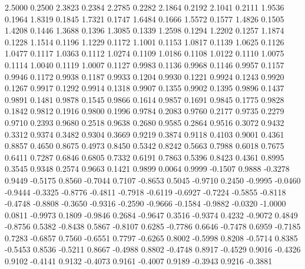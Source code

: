     2.5000    0.2500
    2.3823    0.2384
    2.2785    0.2282
    2.1864    0.2192
    2.1041    0.2111
    1.9536    0.1964
    1.8319    0.1845
    1.7321    0.1747
    1.6484    0.1666
    1.5572    0.1577
    1.4826    0.1505
    1.4208    0.1446
    1.3688    0.1396
    1.3085    0.1339
    1.2598    0.1294
    1.2202    0.1257
    1.1874    0.1228
    1.1514    0.1196
    1.1229    0.1172
    1.1001    0.1153
    1.0817    0.1139
    1.0625    0.1126
    1.0477    0.1117
    1.0363    0.1112
    1.0274    0.1109
    1.0186    0.1108
    1.0122    0.1110
    1.0075    0.1114
    1.0040    0.1119
    1.0007    0.1127
    0.9983    0.1136
    0.9968    0.1146
    0.9957    0.1157
    0.9946    0.1172
    0.9938    0.1187
    0.9933    0.1204
    0.9930    0.1221
    0.9924    0.1243
    0.9920    0.1267
    0.9917    0.1292
    0.9914    0.1318
    0.9907    0.1355
    0.9902    0.1395
    0.9896    0.1437
    0.9891    0.1481
    0.9878    0.1545
    0.9866    0.1614
    0.9857    0.1691
    0.9845    0.1775
    0.9828    0.1842
    0.9812    0.1916
    0.9800    0.1996
    0.9784    0.2083
    0.9760    0.2177
    0.9735    0.2279
    0.9710    0.2393
    0.9680    0.2518
    0.9638    0.2680
    0.9585    0.2864
    0.9516    0.3072
    0.9432    0.3312
    0.9374    0.3482
    0.9304    0.3669
    0.9219    0.3874
    0.9118    0.4103
    0.9001    0.4361
    0.8857    0.4650
    0.8675    0.4973
    0.8450    0.5342
    0.8242    0.5663
    0.7988    0.6018
    0.7675    0.6411
    0.7287    0.6846
    0.6805    0.7332
    0.6191    0.7863
    0.5396    0.8423
    0.4361    0.8995
    0.3545    0.9348
    0.2574    0.9663
    0.1421    0.9899
    0.0064    0.9999
   -0.1507    0.9888
   -0.3278    0.9449
   -0.5175    0.8560
   -0.7044    0.7107
   -0.8653    0.5045
   -0.9710    0.2450
   -0.9995   -0.0460
   -0.9444   -0.3325
   -0.8776   -0.4811
   -0.7918   -0.6119
   -0.6927   -0.7224
   -0.5855   -0.8118
   -0.4748   -0.8808
   -0.3650   -0.9316
   -0.2590   -0.9666
   -0.1584   -0.9882
   -0.0320   -1.0000
    0.0811   -0.9973
    0.1809   -0.9846
    0.2684   -0.9647
    0.3516   -0.9374
    0.4232   -0.9072
    0.4849   -0.8756
    0.5382   -0.8438
    0.5867   -0.8107
    0.6285   -0.7786
    0.6646   -0.7478
    0.6959   -0.7185
    0.7283   -0.6857
    0.7560   -0.6551
    0.7797   -0.6265
    0.8002   -0.5998
    0.8208   -0.5714
    0.8385   -0.5453
    0.8536   -0.5211
    0.8667   -0.4988
    0.8802   -0.4748
    0.8917   -0.4529
    0.9016   -0.4326
    0.9102   -0.4141
    0.9132   -0.4073
    0.9161   -0.4007
    0.9189   -0.3943
    0.9216   -0.3881